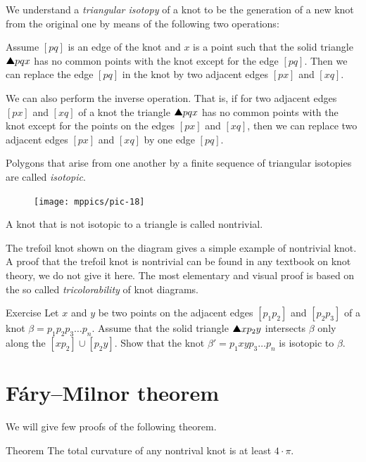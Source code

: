 We understand a \emph{triangular isotopy} of a knot to be the generation of a new knot from the original one by means of the
following two operations:

Assume $[pq]$ is an edge of the knot and $x$
is a point such that the solid triangle $\solidtriangle pqx$  has no common points with the knot except for the edge $[pq]$.
Then we can replace the edge $[pq]$ in the knot by two adjacent edges $[px]$ and $[xq]$.

We can also perform the inverse operation.
That is, if for two adjacent edges $[px]$ and $[xq]$ of a knot the triangle
$\solidtriangle pqx$ has no common points with the knot except for the points on the edges $[px]$ and $[xq]$,
then we can replace two adjacent edges $[px]$ and $[xq]$ by one edge $[pq]$.

Polygons that arise from one another by a finite sequence of
triangular isotopies are called \emph{isotopic}.

\begin{figure}
\vskip-4mm
\centering
\texttt{[image: mppics/pic-18]}
\vskip0mm
\end{figure}

A knot that is not isotopic to a triangle is called nontrivial.

The trefoil knot shown on the diagram gives a simple example of nontrivial knot.
A proof that the trefoil knot is nontrivial can be found in any textbook on knot theory, we do not give it here.
The most elementary and visual proof is based on the so called \emph{tricolorability} of knot diagrams.   

\begin{thm}{Exercise}\label{ex:triangle-isotopy}
Let $x$ and $y$ be two points on the adjacent edges $[p_1p_2]$ and $[p_2p_3]$ of a knot $\beta=p_1p_2p_3\dots p_n$.
Assume that the solid triangle $\solidtriangle xp_2y$ intersects $\beta$ only along the $[xp_2]\cup [p_2y]$.
Show that the knot $\beta'=p_1xyp_3\dots p_n$ is isotopic to $\beta$.
\end{thm}



\section{F\'ary--Milnor theorem}

We will give few proofs of the following theorem.

\begin{thm}{Theorem}\label{thm:fary-milnor}
The total curvature of any nontrival knot is at least $4\cdot\pi$. 
\end{thm}

